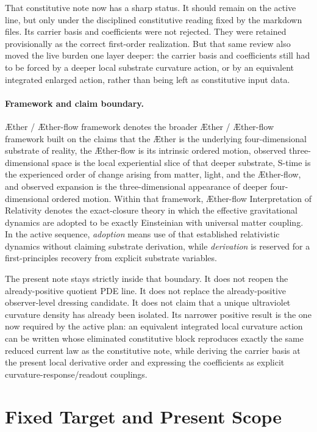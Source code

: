 \documentclass[11pt]{article}
\newcommand{\Aether}{\AE{}ther}
\newcommand{\Aflow}{\AE{}ther-flow}
\newcommand{\TheoryName}{\Aflow{} Interpretation of Relativity}
\newcommand{\TheoryProgram}{\Aether{} / \Aflow{} framework}
\begin{document}
That constitutive note now has a sharp status. It should remain on the active line, but only under the disciplined constitutive reading fixed by the markdown files. Its carrier basis and coefficients were not rejected. They were retained provisionally as the correct first-order realization. But that same review also moved the live burden one layer deeper: the carrier basis and coefficients still had to be forced by a deeper local substrate curvature action, or by an equivalent integrated enlarged action, rather than being left as constitutive input data.

\paragraph{Framework and claim boundary.}
\TheoryProgram{} denotes the broader \Aether{} / \Aflow{} framework built on the claims that the \Aether{} is the underlying four-dimensional substrate of reality, the \Aflow{} is its intrinsic ordered motion, observed three-dimensional space is the local experiential slice of that deeper substrate, S-time is the experienced order of change arising from matter, light, and the \Aflow{}, and observed expansion is the three-dimensional appearance of deeper four-dimensional ordered motion. Within that framework, \TheoryName{} denotes the exact-closure theory in which the effective gravitational dynamics are adopted to be exactly Einsteinian with universal matter coupling. In the active sequence, \emph{adoption} means use of that established relativistic dynamics without claiming substrate derivation, while \emph{derivation} is reserved for a first-principles recovery from explicit substrate variables.

The present note stays strictly inside that boundary. It does not reopen the already-positive quotient PDE line. It does not replace the already-positive observer-level dressing candidate. It does not claim that a unique ultraviolet curvature density has already been isolated. Its narrower positive result is the one now required by the active plan: an equivalent integrated local curvature action can be written whose eliminated constitutive block reproduces exactly the same reduced current law as the constitutive note, while deriving the carrier basis at the present local derivative order and expressing the coefficients as explicit curvature-response/readout couplings.

\section{Fixed Target and Present Scope}
\end{document}
